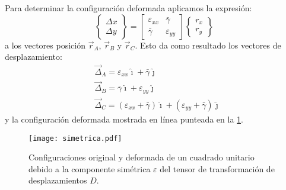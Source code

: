 \documentclass[../notas medios.tex]{subfiles}
\begin{document}
Para determinar la configuración deformada aplicamos la expresión:
\[\begin{Bmatrix}
\Delta x\\
\Delta y
\end{Bmatrix} = \begin{bmatrix}
\varepsilon_{xx} &\bar{\gamma} \\
\bar{\gamma} & \varepsilon_{yy}
\end{bmatrix} \begin{Bmatrix}
r_x\\
r_y
\end{Bmatrix}\]
a los vectores posición $\vec{r}_A$, $\vec{r}_B$ y $\vec{r}_C$. Esto da como 
resultado los vectores de desplazamiento:
\begin{align*}
&\vec{\Delta}_A = \varepsilon_{xx} \hat \imath + \bar{\gamma} \hat \jmath\\
&\vec{\Delta}_B = \bar{\gamma} \hat \imath + \varepsilon_{yy}\hat \jmath\\
&\vec{\Delta}_C = (\varepsilon_{xx} + \bar{\gamma})\hat \imath + 
(\varepsilon_{yy} + \bar{\gamma} )\hat \jmath
\end{align*}
y la configuración deformada mostrada en línea punteada en la \cref{sime}.

\begin{figure}[H]
\centering
	\texttt{[image: simetrica.pdf]}
	\caption{Configuraciones original y deformada de un cuadrado unitario debido a la componente simétrica $\varepsilon$ del tensor de transformación de desplazamientos $D$.}
	\label{sime}
\end{figure}
\end{document}
